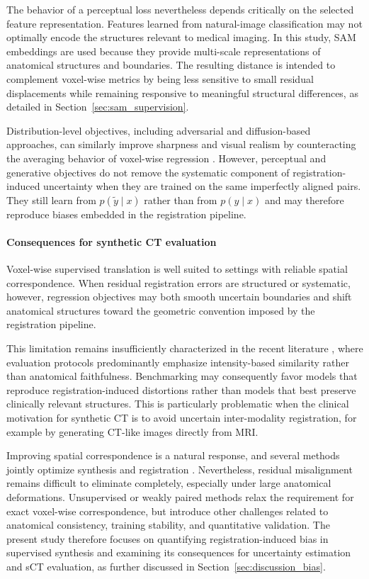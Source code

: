 \documentclass[lettersize,journal]{IEEEtran}
\begin{document}
The behavior of a perceptual loss nevertheless depends critically on the selected feature representation. Features learned from natural-image classification may not optimally encode the structures relevant to medical imaging. In this study, SAM embeddings are used because they provide multi-scale representations of anatomical structures and boundaries. The resulting distance is intended to complement voxel-wise metrics by being less sensitive to small residual displacements while remaining responsive to meaningful structural differences, as detailed in Section~\ref{sec:sam_supervision}.

Distribution-level objectives, including adversarial and diffusion-based approaches, can similarly improve sharpness and visual realism by counteracting the averaging behavior of voxel-wise regression \cite{isola2017image,ho2020denoising}. However, perceptual and generative objectives do not remove the systematic component of registration-induced uncertainty when they are trained on the same imperfectly aligned pairs. They still learn from $p(\tilde{y}\mid x)$ rather than from $p(y\mid x)$ and may therefore reproduce biases embedded in the registration pipeline.

\paragraph{Consequences for synthetic CT evaluation}
Voxel-wise supervised translation is well suited to settings with reliable spatial correspondence. When residual registration errors are structured or systematic, however, regression objectives may both smooth uncertain boundaries and shift anatomical structures toward the geometric convention imposed by the registration pipeline.

This limitation remains insufficiently characterized in the recent literature \cite{florkow2019impact,zimmermann2026eliminating,rossi2021comparison}, where evaluation protocols predominantly emphasize intensity-based similarity rather than anatomical faithfulness. Benchmarking may consequently favor models that reproduce registration-induced distortions rather than models that best preserve clinically relevant structures. This is particularly problematic when the clinical motivation for synthetic CT is to avoid uncertain inter-modality registration, for example by generating CT-like images directly from MRI.

Improving spatial correspondence is a natural response, and several methods jointly optimize synthesis and registration \cite{kong2021breaking,li2025boosting,xin2024deformation}. Nevertheless, residual misalignment remains difficult to eliminate completely, especially under large anatomical deformations. Unsupervised or weakly paired methods relax the requirement for exact voxel-wise correspondence, but introduce other challenges related to anatomical consistency, training stability, and quantitative validation. The present study therefore focuses on quantifying registration-induced bias in supervised synthesis and examining its consequences for uncertainty estimation and sCT evaluation, as further discussed in Section~\ref{sec:discussion_bias}.
\end{document}

